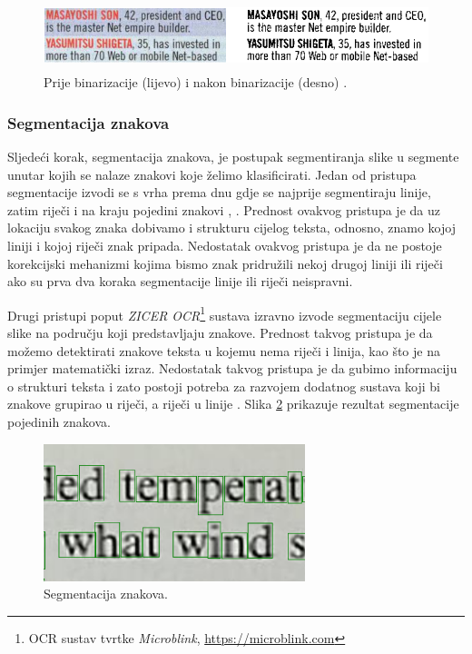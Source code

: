 \documentclass[times, utf8, zavrsni]{fer}
\begin{document}
\begin{figure}[htb]
    \centering
    \includegraphics[height=2cm]{images/binarization.png}
    \caption{Prije binarizacije (lijevo) i nakon binarizacije (desno) \citep{Vynckier:2018:HowOcrWorks}.}
    \label{fig:binarization}
\end{figure}

\subsubsection{Segmentacija znakova}
\label{subsubsec:segmentacija}

Sljedeći korak, segmentacija znakova, je postupak segmentiranja slike u segmente unutar kojih se nalaze znakovi
koje želimo klasificirati. Jedan od pristupa segmentacije izvodi se s vrha prema dnu gdje se najprije
segmentiraju linije, zatim riječi i na kraju pojedini znakovi \citep{Jurin:2017:Master}, \citep{Vynckier:2018:HowOcrWorks}.
Prednost ovakvog pristupa je da uz lokaciju svakog znaka dobivamo i strukturu cijelog teksta, odnosno, znamo kojoj
liniji i kojoj riječi znak pripada. Nedostatak ovakvog pristupa je da ne postoje korekcijski mehanizmi kojima bismo
znak pridružili nekoj drugoj liniji ili riječi ako su prva dva koraka segmentacije linije ili riječi neispravni. \citep{Jurin:2017:Master}

Drugi pristupi poput \emph{ZICER OCR}\footnote{OCR sustav tvrtke \emph{Microblink}, \url{https://microblink.com}} sustava izravno
izvode segmentaciju cijele slike na području koji predstavljaju znakove. Prednost takvog pristupa je da
možemo detektirati znakove teksta u kojemu nema riječi i linija, kao što je na primjer matematički izraz.
Nedostatak takvog pristupa je da gubimo informaciju o strukturi teksta i zato postoji potreba za razvojem dodatnog sustava koji bi znakove
grupirao u riječi, a riječi u linije \citep{Jurin:2017:Master}.
Slika \ref{fig:segmentation} prikazuje rezultat segmentacije pojedinih znakova.

\begin{figure}[htb]
    \centering
    \includegraphics[height=4cm]{images/segmentation.png}
    \caption{Segmentacija znakova.}
    \label{fig:segmentation}
\end{figure}
\end{document}
